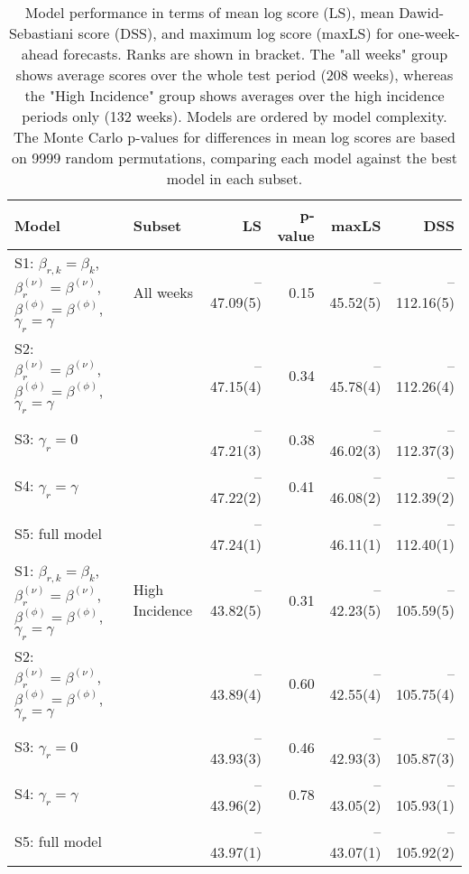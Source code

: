 \begin{table}[ht]
\centering
\begingroup\fontsize{9pt}{10pt}\selectfont
\begin{tabular}{ll|rrrr}
  \hline
Model & Subset & LS & p-value & maxLS & DSS \\ 
  \hline
S1: $\beta_{r,k} = \beta_{k}$, $\beta_{r}^{(\nu)} = \beta^{(\nu)}$, $\beta^{(\phi)} = \beta^{(\phi)}$, $\gamma_r = \gamma$ & All weeks & --47.09(5) & 0.15 & --45.52(5) & --112.16(5) \\ 
  S2: $\beta_{r}^{(\nu)} = \beta^{(\nu)}$, $\beta^{(\phi)} = \beta^{(\phi)}$, $\gamma_r = \gamma$ &  & --47.15(4) & 0.34 & --45.78(4) & --112.26(4) \\ 
  S3: $\gamma_r = 0$ &  & --47.21(3) & 0.38 & --46.02(3) & --112.37(3) \\ 
  S4: $\gamma_r = \gamma$ &  & --47.22(2) & 0.41 & --46.08(2) & --112.39(2) \\ 
  S5: full model &  & --47.24(1) &  & --46.11(1) & --112.40(1) \\ 
   \hline
S1: $\beta_{r,k} = \beta_{k}$, $\beta_{r}^{(\nu)} = \beta^{(\nu)}$, $\beta^{(\phi)} = \beta^{(\phi)}$, $\gamma_r = \gamma$ & High Incidence & --43.82(5) & 0.31 & --42.23(5) & --105.59(5) \\ 
  S2: $\beta_{r}^{(\nu)} = \beta^{(\nu)}$, $\beta^{(\phi)} = \beta^{(\phi)}$, $\gamma_r = \gamma$ &  & --43.89(4) & 0.60 & --42.55(4) & --105.75(4) \\ 
  S3: $\gamma_r = 0$ &  & --43.93(3) & 0.46 & --42.93(3) & --105.87(3) \\ 
  S4: $\gamma_r = \gamma$ &  & --43.96(2) & 0.78 & --43.05(2) & --105.93(1) \\ 
  S5: full model &  & --43.97(1) &  & --43.07(1) & --105.92(2) \\ 
   \hline
\end{tabular}
\endgroup
\caption{Model performance in terms of mean log score (LS),
             mean Dawid-Sebastiani score (DSS), and maximum log score (maxLS)
             for one-week-ahead forecasts.
             Ranks are shown in bracket.
             The "all weeks" group shows average scores over the
             whole test period (208 weeks),
             whereas the "High Incidence" group shows
             averages over the high incidence periods only (132 weeks).
             Models are ordered by model complexity.
             The Monte Carlo p-values for differences in mean log scores
             are based on 9999 random permutations,
             comparing each model against the best model in each subset.} 
\label{tab:forecast}
\end{table}
